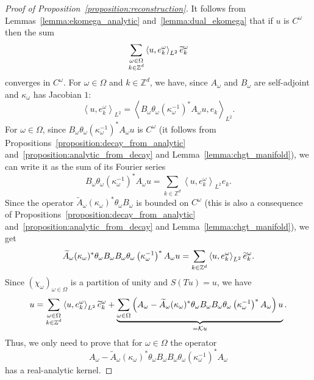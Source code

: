 \documentclass[AHL,Unicode,longabstracts,published]{cedram}
\newcommand{\p}[1]{\left(#1\right)}
\newcommand{\clK}{\mathcal{K}}
\newcommand{\bbZ}{\mathbb{Z}}
\let\oldtilde\tilde
\renewcommand*{\tilde}[1]{\mathchoice{\widetilde{#1}}{\widetilde{#1}}{\oldtilde{#1}}{\oldtilde{#1}}}
\begin{document}
\begin{proof}[Proof of Proposition~\ref{proposition:reconstruction}]
It follows from Lemmas~\ref{lemma:ekomega_analytic} and~\ref{lemma:dual_ekomega} that if $u$ is $C^\omega$ then the sum
\[
\sum_{\substack{\omega \in \Omega \\ k \in \bbZ^d}} \left\langle u, e_k^\omega \right\rangle_{L^2} \tilde{e}_k^\omega
\]
converges in $C^\omega$. For $\omega \in \Omega$ and $k \in \bbZ^d$, we have, since $A_\omega$ and $B_\omega$ are self-adjoint and $\kappa_\omega$ has Jacobian $1$:
\begin{equation*}
\left\langle u, e_k^\omega\right\rangle_{L^2} = \left\langle B_\omega \theta_\omega \left(\kappa_\omega^{-1}\right)^* A_\omega u, e_k\right\rangle_{L^2}.
\end{equation*}
For $\omega \in \Omega$, since $B_\omega \theta_\omega (\kappa_\omega^{-1})^* A_\omega u$ is $C^\omega$ (it follows from Propositions~\ref{proposition:decay_from_analytic} and~\ref{proposition:analytic_from_decay} and Lemma~\ref{lemma:chgt_manifold}), we can write it as the sum of its Fourier series
\begin{equation*}
B_\omega \theta_\omega \left(\kappa_\omega^{-1}\right)^* A_\omega u = \sum_{k \in \bbZ^d} \left\langle u, e_k^\omega\right\rangle_{L^2} e_k.
\end{equation*}
Since the operator $\widetilde{A}_\omega (\kappa_\omega)^* \theta_\omega B_\omega $ is bounded on $C^\omega$ (this is also a consequence of Propositions~\ref{proposition:decay_from_analytic} and~\ref{proposition:analytic_from_decay} and Lemma~\ref{lemma:chgt_manifold}), we get
\begin{equation*}
\widetilde{A}_\omega (\kappa_\omega)^* \theta_\omega B_\omega B_\omega \theta_\omega \left(\kappa_\omega^{-1}\right)^* A_\omega u = \sum_{k \in \bbZ^d} \left\langle u, e_k^\omega \right\rangle_{L^2} \tilde{e}_k^\omega.
\end{equation*}
Since $(\chi_\omega)_{\omega \in \Omega}$ is a partition of unity and $S(Tu) = u$, we have
\begin{equation*}
u = \sum_{\substack{\omega \in \Omega \\ k \in \bbZ^d}} \left\langle u, e_k^\omega \right\rangle_{L^2} \tilde{e}_k^\omega + \underbrace{\sum_{\omega \in \Omega} \p{A_\omega - \widetilde{A}_\omega (\kappa_\omega)^* \theta_\omega B_\omega B_\omega \theta_\omega \left(\kappa_\omega^{-1}\right)^* A_\omega}u}_{= \clK u}.
\end{equation*}
Thus, we only need to prove that for $\omega \in \Omega$ the operator
\begin{equation}\label{eq:analytic_whole}
A_\omega - \widetilde{A}_\omega (\kappa_\omega)^* \theta_\omega B_\omega B_\omega \theta_\omega \left(\kappa_\omega^{-1}\right)^* A_\omega
\end{equation}
has a real-analytic kernel.


\end{proof}
\end{document}
